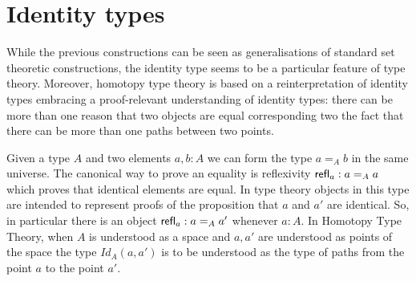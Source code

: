 


\section{Identity types}
\label{sec:identity-types}

While the previous constructions can be seen as generalisations of
standard set theoretic constructions, the identity type seems to be
a particular feature of type theory. Moreover, homotopy type theory is
based on a reinterpretation of identity types embracing a
proof-relevant understanding of identity types: there can be more than
one reason that two objects are equal corresponding two the fact that
there can be more than one paths between two points.

Given a type $A$ and two elements $a,b:A$ we can form the type $a=_A
b$ in the same universe. The canonical way to prove an equality is
reflexivity $\mathsf{refl}_{a} : a =_A a$ which proves that identical elements
are equal. In type theory objects in this type are intended to
represent proofs of the proposition that $a$ and $a'$ are identical.
So, in particular there is an object $\mathsf{refl}_{a}: a =_A a'$ whenever
$a:A$. In Homotopy Type Theory, when $A$ is understood as a space and
$a,a'$ are understood as points of the space the type $Id_A(a,a')$ is
to be understood as the type of paths from the point $a$ to the point
$a'$.

